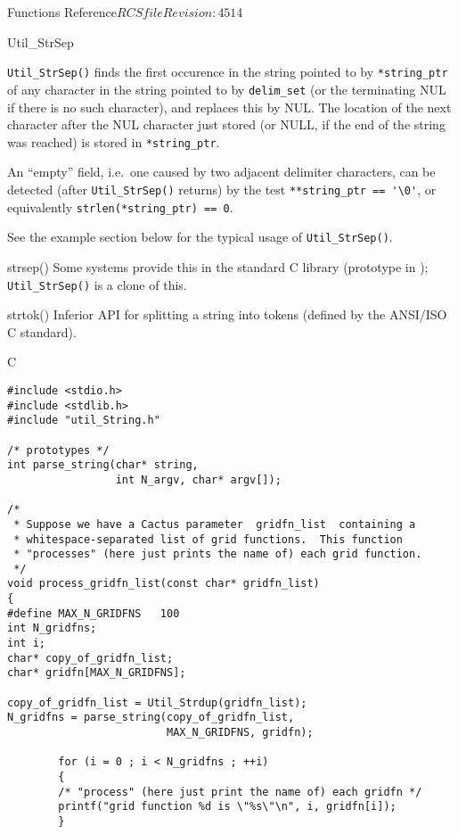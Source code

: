 \begin{cactuspart}{ Functions Reference}{$RCSfile$}{$Revision: 4514 $}
\begin{FunctionDescription}{Util\_StrSep}
\begin{Discussion}
\verb|Util_StrSep()| finds the first occurence in the string pointed
to by \verb|*string_ptr| of any character in the string pointed to by
\verb|delim_set| (or the terminating NUL if there is no such character),
and replaces this by NUL.  The location of the next character after the
NUL character just stored (or NULL, if the end of the string was reached)
is stored in \verb|*string_ptr|.

An ``empty'' field, i.e.\ one caused by two adjacent delimiter characters,
can be detected (after \verb|Util_StrSep()| returns) by the test
\verb|**string_ptr == '\0'|, or equivalently \verb|strlen(*string_ptr) == 0|.

See the example section below for the typical usage of \verb|Util_StrSep()|.
\end{Discussion}

\begin{SeeAlsoSection}
\begin{SeeAlso}{strsep()}
Some systems provide this in the standard C library
(prototype in ); \verb|Util_StrSep()| is a clone of this.
\end{SeeAlso}
\begin{SeeAlso}{strtok()}
Inferior API for splitting a string into tokens
(defined by the ANSI/ISO C standard).
\end{SeeAlso}
\end{SeeAlsoSection}

\begin{ExampleSection}
\begin{Example}{C}
\begin{verbatim}
#include <stdio.h>
#include <stdlib.h>
#include "util_String.h"

/* prototypes */
int parse_string(char* string,
                 int N_argv, char* argv[]);

/*
 * Suppose we have a Cactus parameter  gridfn_list  containing a
 * whitespace-separated list of grid functions.  This function
 * "processes" (here just prints the name of) each grid function.
 */
void process_gridfn_list(const char* gridfn_list)
{
#define MAX_N_GRIDFNS   100
int N_gridfns;
int i;
char* copy_of_gridfn_list;
char* gridfn[MAX_N_GRIDFNS];

copy_of_gridfn_list = Util_Strdup(gridfn_list);
N_gridfns = parse_string(copy_of_gridfn_list,
                         MAX_N_GRIDFNS, gridfn);

        for (i = 0 ; i < N_gridfns ; ++i)
        {
        /* "process" (here just print the name of) each gridfn */
        printf("grid function %d is \"%s\"\n", i, gridfn[i]);
        }


\end{verbatim}
\end{Example}
\end{ExampleSection}
\end{FunctionDescription}
\end{cactuspart}
